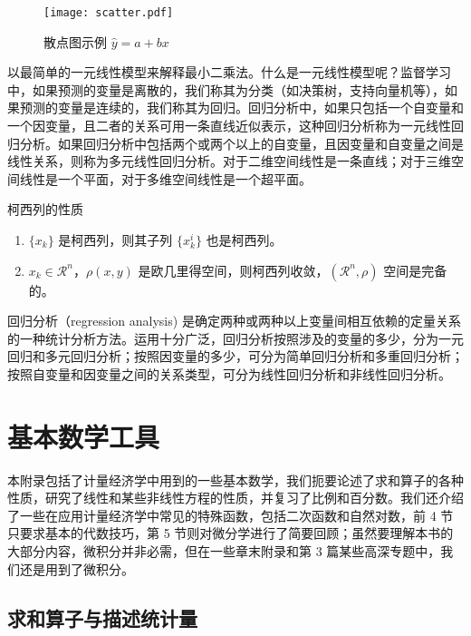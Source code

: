 \documentclass[cn,11pt,fancy,hide,pad]{elegantbook}
\begin{document}
\begin{figure}[htbp]
	\centering
	\texttt{[image: scatter.pdf]}
	\caption{散点图示例 $\hat{y}=a+bx$ \label{fig:scatter}}
\end{figure}

以最简单的一元线性模型来解释最小二乘法。什么是一元线性模型呢？监督学习中，如果预测的变量是离散的，我们称其为分类（如决策树，支持向量机等），如果预测的变量是连续的，我们称其为回归。回归分析中，如果只包括一个自变量和一个因变量，且二者的关系可用一条直线近似表示，这种回归分析称为一元线性回归分析。如果回归分析中包括两个或两个以上的自变量，且因变量和自变量之间是线性关系，则称为多元线性回归分析。对于二维空间线性是一条直线；对于三维空间线性是一个平面，对于多维空间线性是一个超平面。

\begin{property}\label{property:cauchy}
柯西列的性质
\begin{enumerate}
\item $\{x_k\}$ 是柯西列，则其子列 $\{x_k^i\}$ 也是柯西列。
\item $x_k\in \mathcal{R}^n$，$\rho(x,y)$ 是欧几里得空间，则柯西列收敛，$(\mathcal{R}^n,\rho)$ 空间是完备的。
\end{enumerate}
\end{property}

\begin{conclusion}
回归分析（regression analysis) 是确定两种或两种以上变量间相互依赖的定量关系的一种统计分析方法。运用十分广泛，回归分析按照涉及的变量的多少，分为一元回归和多元回归分析；按照因变量的多少，可分为简单回归分析和多重回归分析；按照自变量和因变量之间的关系类型，可分为线性回归分析和非线性回归分析。
\end{conclusion}


\nocite{*} 



\appendix
\chapter{基本数学工具}

本附录包括了计量经济学中用到的一些基本数学，我们扼要论述了求和算子的各种性质，研究了线性和某些非线性方程的性质，并复习了比例和百分数。我们还介绍了一些在应用计量经济学中常见的特殊函数，包括二次函数和自然对数，前 4 节只要求基本的代数技巧，第 5 节则对微分学进行了简要回顾；虽然要理解本书的大部分内容，微积分并非必需，但在一些章末附录和第 3 篇某些高深专题中，我们还是用到了微积分。

\section{求和算子与描述统计量}
\end{document}
